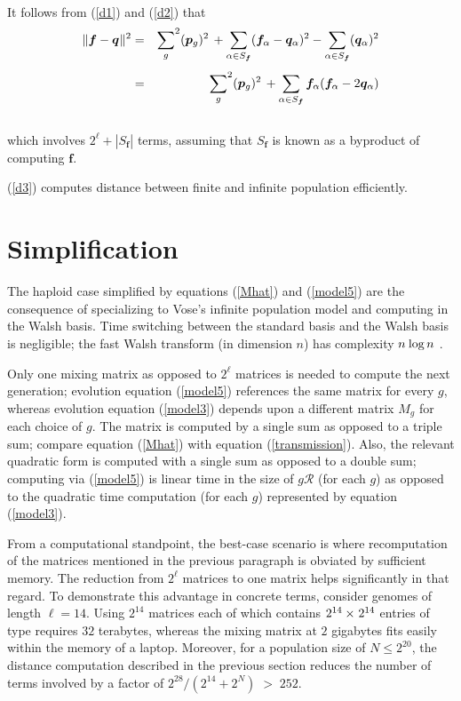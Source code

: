 \mbox{ }\\[-.15in]
It follows from (\ref{d1}) and (\ref{d2}) that
\begin{eqnarray}
  \|{\bm f} - {\bm q} \hspace{0.005in} \|^2
  & = & 
      {\sum_{g}}^2 ({\bm p}_{g})^2 \, +
      \sum_{\alpha \in {S_{\bm f}}} ({\bm f}_\alpha-{\bm q}_\alpha)^2 -
      \sum_{\alpha \in {S_{\bm f}}} ( {\bm q}_{\alpha})^2
      \nonumber \\[0.05in]
      & = &
      {\sum_{g}}^2 ({\bm p}_{g})^2 \, +
      \sum_{\alpha \in {S_{\bm f}}} {\bm f}_\alpha ({\bm f}_\alpha- 2 {\bm q}_\alpha) \label{d3}
\end{eqnarray}
\mbox{ }\\[-.1in] which involves $2^\ell + |S_{\bm f}|$ terms,
assuming that  $S_{\bm f}$ is known as a byproduct of computing ${\bm f}$.

(\ref{d3}) computes distance between finite and infinite population efficiently.


\section{Simplification} 
The haploid case simplified by equations (\ref{Mhat}) and (\ref{model5})
are the consequence of specializing to Vose's infinite population model and computing in the Walsh basis. Time switching between the standard basis and the Walsh basis is negligible; the fast Walsh transform (in dimension $n$) has complexity $n \hspace{0.01in} \log n$ \cite{Shanks1969}.

Only one mixing matrix as opposed to $2^\ell$ matrices is needed to compute the next generation; evolution equation (\ref{model5}) references the same matrix for every $g$, whereas evolution equation (\ref{model3}) depends upon a different matrix $M_g$ for each choice of $g$. The matrix is computed by a single sum as opposed to a triple sum; compare equation (\ref{Mhat}) with equation (\ref{transmission}).  Also, the relevant quadratic form is computed with a single sum as opposed to a double sum; computing via (\ref{model5}) is linear time in the size of $g \mathcal{R}$ (for each $g$) as opposed to the quadratic time computation (for each $g$) represented by equation (\ref{model3}).

From a computational standpoint, the best-case scenario is where
recomputation of the matrices mentioned in the previous paragraph is
obviated by sufficient memory.  The reduction from $2^\ell$ matrices
to one matrix helps significantly in that regard. To demonstrate this
advantage in concrete terms, consider genomes of length $\ell = 14$.
Using $2^{14}$ matrices each of which contains $2^{14} \times \hspace{0.01in}
2^{14}$ entries of type \verb@double@ requires $32$ terabytes, whereas
the mixing matrix at $2$ gigabytes fits easily within the memory of a
laptop.  Moreover, for a population size of $N \le 2^{20}$, the
distance computation described in the previous section reduces the
number of terms involved by a factor of
$2^{28}/(2^{14} + 2^{N}) \; > \; 252$.

